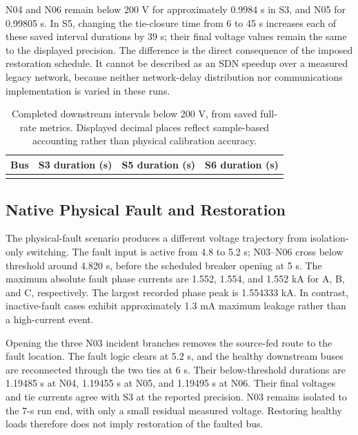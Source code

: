 N04 and N06 remain below 200 V for approximately 0.9984 s in S3, and N05 for
0.99805 s. In S5, changing the tie-closure time from 6 to 45 s increases each
of these saved interval durations by 39 s; their final voltage values remain
the same to the displayed precision. The difference is the direct consequence
of the imposed restoration schedule. It cannot be described as an SDN speedup
over a measured legacy network, because neither network-delay distribution nor
communications implementation is varied in these runs.

\begin{table}[tb]
\centering\small
\caption{Completed downstream intervals below 200 V, from saved full-rate
metrics. Displayed decimal places reflect sample-based accounting rather than
physical calibration accuracy.}
\label{tab:interruptions}
\begin{tabular}{@{}lrrr@{}}
\toprule
Bus & S3 duration (s) & S5 duration (s) & S6 duration (s) \\
\midrule
\\
\bottomrule
\end{tabular}
\end{table}

\subsection{Native Physical Fault and Restoration}
The physical-fault scenario produces a different voltage trajectory from
isolation-only switching. The fault input is active from 4.8 to 5.2 s;
N03--N06 cross below threshold around 4.820 s, before the scheduled breaker
opening at 5 s. The maximum absolute fault phase currents are 1.552, 1.554,
and 1.552 kA for A, B, and C, respectively. The largest recorded phase peak
is 1.554333 kA. In contrast, inactive-fault cases exhibit approximately
1.3 mA maximum leakage rather than a high-current event.

Opening the three N03 incident branches removes the source-fed route to the
fault location. The fault logic clears at 5.2 s, and the healthy downstream
buses are reconnected through the two ties at 6 s. Their below-threshold
durations are 1.19485 s at N04, 1.19455 s at N05, and 1.19495 s at N06.
Their final voltages and tie currents agree with S3 at the reported precision.
N03 remains isolated to the 7-s run end, with only a small residual measured
voltage. Restoring healthy loads therefore does not imply restoration of the
faulted bus.

